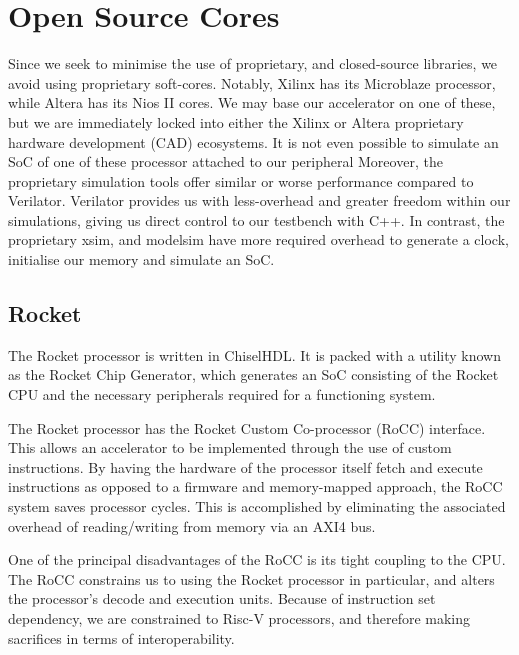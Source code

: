 \documentclass[a4paper,8pt]{report}
\begin{document}

\section{Open Source Cores}
Since we seek to minimise the use of proprietary, and closed-source libraries,
we avoid using proprietary soft-cores. Notably, Xilinx has its Microblaze
processor, while Altera has its Nios II cores. We may base our accelerator on
one of these, but we are immediately locked into either the Xilinx or Altera
proprietary hardware development (CAD) ecosystems. It is not even possible to
simulate an SoC of one of these processor attached to our peripheral
Moreover, the proprietary simulation tools offer similar or worse performance
compared to Verilator. Verilator provides us with less-overhead and greater
freedom within our simulations, giving us direct control to our testbench with
C++. In contrast, the proprietary xsim, and modelsim have more required overhead
to generate a clock, initialise our memory and simulate an SoC.

\subsection{Rocket}
The Rocket processor is written in ChiselHDL. It is packed with a utility known
as the Rocket Chip Generator, which generates an SoC consisting of the Rocket
CPU and the necessary peripherals required for a functioning system. 


The Rocket processor has the Rocket Custom Co-processor (RoCC) interface. This
allows an accelerator to be implemented through the use of custom instructions.
By having the hardware of the processor itself fetch and execute instructions as
opposed to a firmware and memory-mapped approach, the RoCC system saves
processor cycles. This is accomplished by eliminating the associated overhead of
reading/writing from memory via an AXI4 bus.

One of the principal disadvantages of the RoCC is its tight coupling to the CPU.
The RoCC constrains us to using the Rocket processor in particular, and alters
the processor's decode and execution units. Because of instruction set
dependency, we are constrained to Risc-V processors, and therefore making
sacrifices in terms of interoperability. 
\end{document}
